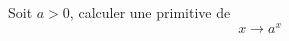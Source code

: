 Soit $a>0$, calculer une primitive de 
\begin{displaymath}
 x \rightarrow a^{x}
\end{displaymath}
\bigskip \bigskip